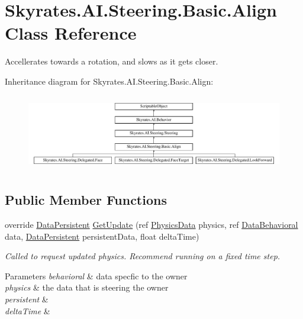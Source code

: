 \hypertarget{class_skyrates_1_1_a_i_1_1_steering_1_1_basic_1_1_align}{\section{Skyrates.\-A\-I.\-Steering.\-Basic.\-Align Class Reference}
\label{class_skyrates_1_1_a_i_1_1_steering_1_1_basic_1_1_align}
}


Accellerates towards a rotation, and slows as it gets closer.  


Inheritance diagram for Skyrates.\-A\-I.\-Steering.\-Basic.\-Align\-:\begin{figure}[H]
\begin{center}
\leavevmode
\includegraphics[height=3.381642cm]{class_skyrates_1_1_a_i_1_1_steering_1_1_basic_1_1_align}
\end{center}
\end{figure}
\subsection*{Public Member Functions}
\begin{DoxyCompactItemize}
\item 
\hypertarget{class_skyrates_1_1_a_i_1_1_steering_1_1_basic_1_1_align_a52697da0560d1484067257e9c6e81428}{override \hyperlink{class_skyrates_1_1_a_i_1_1_behavior_1_1_data_persistent}{Data\-Persistent} \hyperlink{class_skyrates_1_1_a_i_1_1_steering_1_1_basic_1_1_align_a52697da0560d1484067257e9c6e81428}{Get\-Update} (ref \hyperlink{class_skyrates_1_1_physics_1_1_physics_data}{Physics\-Data} physics, ref \hyperlink{class_skyrates_1_1_a_i_1_1_behavior_1_1_data_behavioral}{Data\-Behavioral} data, \hyperlink{class_skyrates_1_1_a_i_1_1_behavior_1_1_data_persistent}{Data\-Persistent} persistent\-Data, float delta\-Time)}\label{class_skyrates_1_1_a_i_1_1_steering_1_1_basic_1_1_align_a52697da0560d1484067257e9c6e81428}

\begin{DoxyCompactList}\small\item\em Called to request updated physics. Recommend running on a fixed time step. 


\begin{DoxyParams}{Parameters}
{\em behavioral} & data specfic to the owner\\
\hline
{\em physics} & the data that is steering the owner\\
\hline
{\em persistent} & \\
\hline
{\em delta\-Time} & \\
\hline
\end{DoxyParams}
 \end{DoxyCompactList}\end{DoxyCompactItemize}
